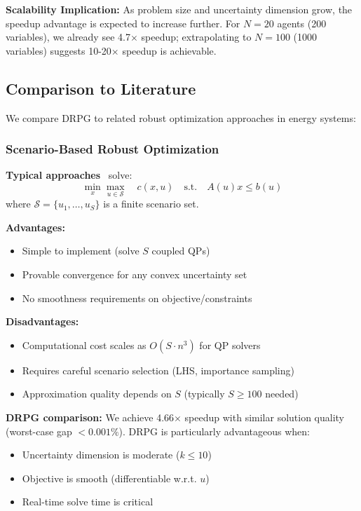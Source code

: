 \textbf{Scalability Implication:} As problem size and uncertainty dimension grow, the speedup advantage is expected to increase further. For $N=20$ agents (200 variables), we already see 4.7$\times$ speedup; extrapolating to $N=100$ (1000 variables) suggests 10-20$\times$ speedup is achievable.

\subsection{Comparison to Literature}
\label{sec:literature_comparison}

We compare DRPG to related robust optimization approaches in energy systems:

\subsubsection{Scenario-Based Robust Optimization}

\textbf{Typical approaches}~\cite{Bertsimas2011,Zhao2013} solve:
\begin{equation}
\min_x \max_{u \in \mathcal{S}} \quad c(x, u) \quad \text{s.t.} \quad A(u) x \leq b(u)
\end{equation}
where $\mathcal{S} = \{u_1, \ldots, u_S\}$ is a finite scenario set.

\textbf{Advantages:}
\begin{itemize}
    \item Simple to implement (solve $S$ coupled QPs)
    \item Provable convergence for any convex uncertainty set
    \item No smoothness requirements on objective/constraints
\end{itemize}

\textbf{Disadvantages:}
\begin{itemize}
    \item Computational cost scales as $O(S \cdot n^3)$ for QP solvers
    \item Requires careful scenario selection (LHS, importance sampling)
    \item Approximation quality depends on $S$ (typically $S \geq 100$ needed)
\end{itemize}

\textbf{DRPG comparison:} We achieve 4.66$\times$ speedup with similar solution quality (worst-case gap $< 0.001\%$). DRPG is particularly advantageous when:
\begin{itemize}
    \item Uncertainty dimension is moderate ($k \leq 10$)
    \item Objective is smooth (differentiable w.r.t. $u$)
    \item Real-time solve time is critical
\end{itemize}

